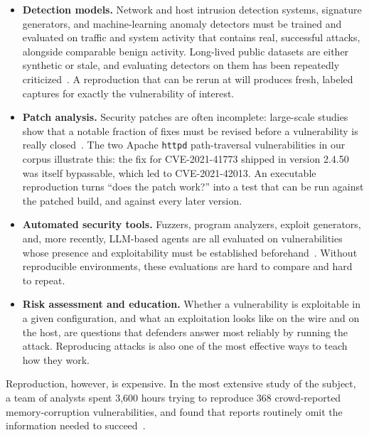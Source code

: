 \begin{itemize}
\item \textbf{Detection models.} Network and host intrusion detection systems,
signature generators, and machine-learning anomaly detectors must be trained
and evaluated on traffic and system activity that contains real, successful
attacks, alongside comparable benign activity. Long-lived public datasets are
either synthetic or stale, and evaluating detectors on them has been
repeatedly criticized~\cite{sommer2010outside,lippmann2000darpa,creech2013adfa}.
A reproduction that can be rerun at will produces fresh, labeled captures for
exactly the vulnerability of interest.

\item \textbf{Patch analysis.} Security patches are often incomplete:
large-scale studies show that a notable fraction of fixes must be revised
before a vulnerability is really closed~\cite{li2017patches}. The two Apache
\texttt{httpd} path-traversal vulnerabilities in our corpus illustrate this:
the fix for CVE-2021-41773 shipped in version 2.4.50 was itself bypassable,
which led to CVE-2021-42013. An executable reproduction turns ``does the
patch work?'' into a test that can be run against the patched build, and
against every later version.

\item \textbf{Automated security tools.} Fuzzers, program analyzers, exploit
generators, and, more recently, LLM-based agents are all evaluated on
vulnerabilities whose presence and exploitability must be established
beforehand~\cite{hazimeh2020magma,zhu2025cvebench,wang2026cybergym}. Without
reproducible environments, these evaluations are hard to compare and hard to
repeat.

\item \textbf{Risk assessment and education.} Whether a vulnerability is
exploitable in a given configuration, and what an exploitation looks like on
the wire and on the host, are questions that defenders answer most reliably
by running the attack. Reproducing attacks is also one of the most effective
ways to teach how they work.
\end{itemize}

Reproduction, however, is expensive. In the most extensive study of the
subject, a team of analysts spent 3,600 hours trying to reproduce 368
crowd-reported memory-corruption vulnerabilities, and found that reports
routinely omit the information needed to succeed~\cite{mu2018reproducibility}.

